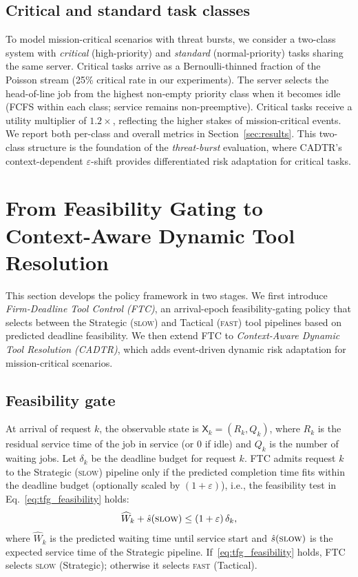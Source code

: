 \documentclass[fleqn,12pt,lineno]{wlpeerj}
\begin{document}
\subsection{Critical and standard task classes}
\label{sec:premium_extension}

To model mission-critical scenarios with threat bursts, we consider a two-class system with \emph{critical} (high-priority) and \emph{standard} (normal-priority) tasks sharing the same server. Critical tasks arrive as a Bernoulli-thinned fraction of the Poisson stream (25\% critical rate in our experiments). The server selects the head-of-line job from the highest non-empty priority class when it becomes idle (FCFS within each class; service remains non-preemptive). Critical tasks receive a utility multiplier of $1.2\times$, reflecting the higher stakes of mission-critical events. We report both per-class and overall metrics in Section~\ref{sec:results}. This two-class structure is the foundation of the \emph{threat-burst} evaluation, where CADTR's context-dependent $\varepsilon$-shift provides differentiated risk adaptation for critical tasks.

\section{From Feasibility Gating to Context-Aware Dynamic Tool Resolution}
\label{sec:tfg}

This section develops the policy framework in two stages. We first introduce \emph{Firm-Deadline Tool Control (FTC)}, an arrival-epoch feasibility-gating policy that selects between the Strategic (\textsc{slow}) and Tactical (\textsc{fast}) tool pipelines based on predicted deadline feasibility. We then extend FTC to \emph{Context-Aware Dynamic Tool Resolution (CADTR)}, which adds event-driven dynamic risk adaptation for mission-critical scenarios.

\subsection{Feasibility gate}
\label{sec:tfg_gate}

At arrival of request $k$, the observable state is $\mathsf{X}_k=(R_k,Q_k)$, where $R_k$ is the residual service time of the job in service (or $0$ if idle) and $Q_k$ is the number of waiting jobs. Let $\delta_k$ be the deadline budget for request $k$. FTC admits request $k$ to the Strategic (\textsc{slow}) pipeline only if the predicted completion time fits within the deadline budget (optionally scaled by $(1+\varepsilon)$), i.e., the feasibility test in Eq.~\eqref{eq:tfg_feasibility} holds:
\begin{equation}
\widehat{W}_k + \hat{s}(\textsc{slow}) \le (1+\varepsilon)\,\delta_k,
\label{eq:tfg_feasibility}
\end{equation}
where $\widehat{W}_k$ is the predicted waiting time until service start and $\hat{s}(\textsc{slow})$ is the expected service time of the Strategic pipeline. If~\eqref{eq:tfg_feasibility} holds, FTC selects \textsc{slow} (Strategic); otherwise it selects \textsc{fast} (Tactical).
\end{document}
